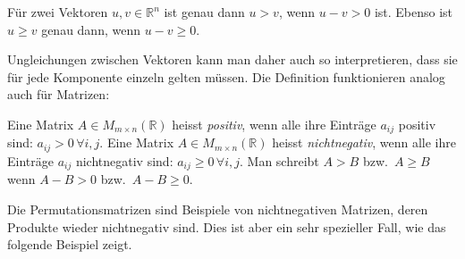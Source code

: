 \begin{definition}
Für zwei Vektoren $u,v\in\mathbb{R}^n$ ist genau dann $u>v$, wenn
$u-v > 0$ ist.
Ebenso ist $u\ge v$ genau dann, wenn $u-v\ge 0$.
\end{definition}

Ungleichungen zwischen Vektoren kann man daher auch so interpretieren,
dass sie für jede Komponente einzeln gelten müssen.
Die Definition funktionieren analog auch für Matrizen:

\begin{definition}
Eine Matrix $A\in M_{m\times n}(\mathbb{R})$  heisst {\em positiv},
wenn alle ihre Einträge $a_{i\!j}$ positiv sind: $a_{i\!j}>0\,\forall i,j$.
Eine Matrix $A\in M_{m\times n}(\mathbb{R})$  heisst {\em nichtnegativ},
wenn alle ihre Einträge $a_{i\!j}$ nichtnegativ sind: $a_{i\!j}\ge 0\,\forall i,j$.
%
%
Man schreibt $A>B$ bzw.~$A\ge B$ wenn $A-B>0$ bzw.~$A-B\ge 0$.
\end{definition}

Die Permutationsmatrizen sind Beispiele von nichtnegativen Matrizen,
deren Produkte wieder nichtnegativ sind.
Dies ist aber ein sehr spezieller Fall, wie das folgende Beispiel
zeigt.

